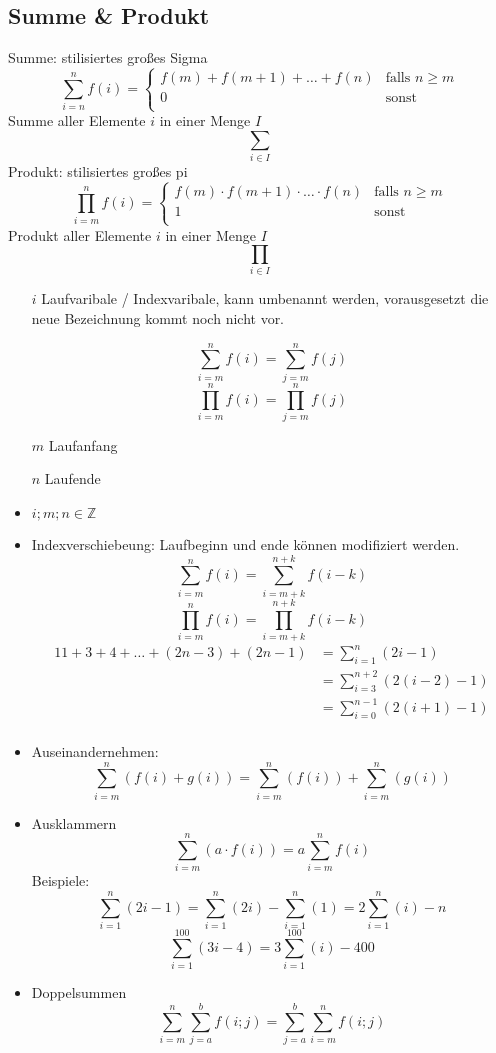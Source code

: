 \subsection{Summe \& Produkt}
Summe: stilisiertes großes Sigma
$$\sum\limits_{i = n}^n f(i) = \left \lbrace \begin{array}{ll}
                                                 f(m) + f(m + 1) + \dots + f(n) & \textrm{falls } n \geq m \\
                                                 0                              & \textrm{sonst}           \\
\end{array} \right.$$
Summe aller Elemente $i$ in einer Menge $I$
$$\sum\limits_{i \in I}$$
Produkt: stilisiertes großes pi
$$\prod\limits_{i=m}^{n} f(i) = \left \lbrace \begin{array}{ll}
                                                  f(m) \cdot f(m + 1) \cdot \dots \cdot f(n) & \textrm{falls } n \geq m \\
                                                  1                                          & \textrm{sonst}           \\
\end{array} \right.$$
Produkt aller Elemente $i$ in einer Menge $I$
$$\prod\limits_{i \in I}$$
\begin{itemize}
    \item[$i$] Laufvaribale / Indexvaribale, kann umbenannt werden, vorausgesetzt die neue Bezeichnung kommt noch nicht vor.
    \item[] $$\sum\limits_{i = m}^n f(i) = \sum\limits_{j = m}^n f(j)$$
    $$\prod\limits_{i = m}^n f(i) = \prod\limits_{j = m}^n f(j)$$
    \item[$m$] Laufanfang
    \item[$n$] Laufende
    \item $i;m;n \in \mathbb{Z}$
    \item Indexverschiebeung: Laufbeginn und ende können modifiziert werden.
    $$\sum\limits_{i=m}^n f(i) = \sum\limits_{i=m+k}^{n+k} f(i-k)$$
    $$\prod\limits_{i=m}^n f(i) = \prod\limits_{i=m+k}^{n+k} f(i-k)$$
    \begin{alignat*}{1}
        1+3+4+\dots+(2n-3)+(2n-1) & = \sum\limits_{i = 1}^n (2i-1)             \\
        & = \sum\limits_{i = 3}^{n + 2} (2(i - 2)-1) \\
        & = \sum\limits_{i = 0}^{n - 1} (2(i + 1)-1) \\
    \end{alignat*}
    \item Auseinandernehmen:
    $$\sum\limits_{i=m}^n (f(i) + g(i)) = \sum\limits_{i=m}^n (f(i)) + \sum\limits_{i=m}^n (g(i))$$
    \item Ausklammern
    $$\sum\limits_{i=m}^n (a \cdot f(i)) = a \sum\limits_{i=m}^n f(i)$$
    Beispiele:
    $$\sum\limits_{i=1}^n (2i-1) = \sum\limits_{i=1}^n (2i) - \sum\limits_{i=1}^n (1) = 2\sum\limits_{i=1}^n (i) - n$$
    $$\sum\limits_{i=1}^{100} (3i-4) = 3\sum\limits_{i=1}^{100} (i) - 400$$
    \item Doppelsummen
    $$\sum\limits_{i=m}^n \sum\limits_{j=a}^b f(i; j) = \sum\limits_{j=a}^b \sum\limits_{i=m}^n f(i; j)$$
\end{itemize}
